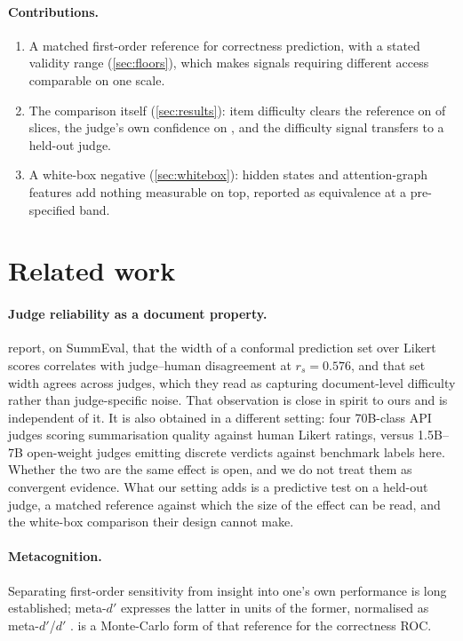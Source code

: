 \documentclass{article}
\begin{document}
\paragraph{Contributions.}
\begin{enumerate}[nosep,leftmargin=*]
\item A matched first-order reference for correctness prediction, with a stated validity range
      (\cref{sec:floors}), which makes signals requiring different access comparable on one scale.
\item The comparison itself (\cref{sec:results}): item difficulty clears the reference on
      \NClearBaseline{} of \NSlicesUsable{} slices, the judge's own confidence on \NClearConfidence{}, and
      the difficulty signal transfers to a held-out judge.
\item A white-box negative (\cref{sec:whitebox}): hidden states and attention-graph features add
      nothing measurable on top, reported as equivalence at a pre-specified band.
\end{enumerate}

\section{Related work}
\label{sec:related}

\paragraph{Judge reliability as a document property.} \citet{tan2026conformal} report, on
SummEval, that the width of a conformal prediction set over Likert scores correlates with
judge--human disagreement at $r_s = 0.576$, and that set width agrees across judges, which they read
as capturing document-level difficulty rather than judge-specific noise. That observation is close
in spirit to ours and is independent of it. It is also obtained in a different setting: four
70B-class API judges scoring summarisation quality against human Likert ratings, versus 1.5B--7B
open-weight judges emitting discrete verdicts against benchmark labels here. Whether the two are the
same effect is open, and we do not treat them as convergent evidence. What our setting adds is a
predictive test on a held-out judge, a matched reference against which the size of the effect can be
read, and the white-box comparison their design cannot make.

\paragraph{Metacognition.} Separating first-order sensitivity from insight into one's own
performance is long established; meta-$d'$ \citep{maniscalco2012} expresses the latter in units of
the former, normalised as meta-$d'$/$d'$ \citep{fleming2014}.  is a Monte-Carlo
form of that reference for the correctness ROC.
\end{document}

